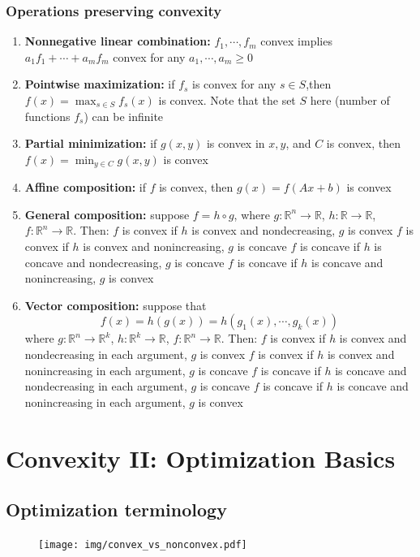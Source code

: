 \documentclass[a4paper]{article}
\begin{document}
{\subsubsection{Operations preserving convexity}
\begin{enumerate}
  \item \textbf{Nonnegative linear combination:} $f_1,\cdots,f_m$ convex implies $a_1f_1 + \cdots + a_mf_m$ convex for any $a_1,\cdots,a_m \geq 0$
  \item \textbf{Pointwise maximization:} if $f_s$ is convex for any $s \in S$,then $f(x) = \max_{s \in S} f_s(x)$ is convex. Note that the set $S$ here (number of functions $f_s$) can be infinite
  \item \textbf{Partial minimization:} if $g(x,y)$ is convex in $x, y$, and $C$ is convex, then $f(x) = \min_{y \in C}g(x,y)$ is convex
  \item \textbf{Affine composition:} if $f$ is convex, then $g(x)=f(Ax+b)$ is convex
  \item \textbf{General composition:} suppose $f = h\circ g$, where $g : \mathbb{R}^n \rightarrow \mathbb{R}$, $h : \mathbb{R} \rightarrow \mathbb{R}$, $f : \mathbb{R}^n \rightarrow \mathbb{R}$. Then:
  \subitem $f$ is convex if $h$ is convex and nondecreasing, $g$ is convex
  \subitem $f$ is convex if $h$ is convex and nonincreasing, $g$ is concave
  \subitem $f$ is concave if $h$ is concave and nondecreasing, $g$ is concave
  \subitem $f$ is concave if $h$ is concave and nonincreasing, $g$ is convex
  \item \textbf{Vector composition:} suppose that
  \[
    f(x) = h(g(x)) = h(g_1(x), \cdots, g_k(x))
  \]
  where $g : \mathbb{R}^n \rightarrow \mathbb{R}^k$, $h : \mathbb{R}^k \rightarrow \mathbb{R}$, $f : \mathbb{R}^n \rightarrow \mathbb{R}$. Then:
  \subitem $f$ is convex if $h$ is convex and nondecreasing in each argument, $g$ is convex
  \subitem $f$ is convex if $h$ is convex and nonincreasing in each argument, $g$ is concave
  \subitem $f$ is concave if $h$ is concave and nondecreasing in each argument, $g$ is concave
  \subitem $f$ is concave if $h$ is concave and nonincreasing in each argument, $g$ is convex
\end{enumerate}

\section{Convexity II: Optimization Basics}
\subsection{Optimization terminology}
\begin{figure}[htbp] 
  \centering 
  \texttt{[image: img/convex\_vs\_nonconvex.pdf]} 
\end{figure}

}
\end{document}
